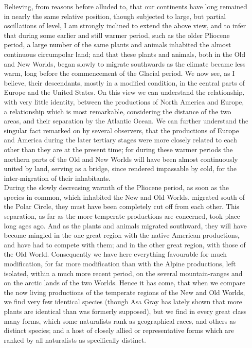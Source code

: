 \indent Believing, from reasons before alluded to, that our continents have long remained in nearly the same relative position, though subjected to large, but partial oscillations of level, I am strongly inclined to extend the above view, and to infer that during some earlier and still warmer period, such as the older Pliocene period, a large number of the same plants and animals inhabited the almost continuous circumpolar land; and that these plants and animals, both in the Old and New Worlds, began slowly to migrate southwards as the climate became less warm, long before the commencement of the Glacial period. We now see, as I believe, their descendants, mostly in a modified condition, in the central parts of Europe and the United States. On this view we can understand the relationship, with very little identity, between the productions of North America and Europe, a relationship which is most remarkable, considering the distance of the two areas, and their separation by the Atlantic Ocean.  We can further understand the singular fact remarked on by several observers, that the productions of Europe and America during the later tertiary stages were more closely related to each other than they are at the present time; for during these warmer periods the northern parts of the Old and New Worlds will have been almost continuously united by land, serving as a bridge, since rendered impassable by cold, for the inter-migration of their inhabitants.~\\
\indent During the slowly decreasing warmth of the Pliocene period, as soon as the species in common, which inhabited the New and Old Worlds, migrated south of the Polar Circle, they must have been completely cut off from each other. This separation, as far as the more temperate productions are concerned, took place long ages ago. And as the plants and animals migrated southward, they will have become mingled in the one great region with the native American productions, and have had to compete with them; and in the other great region, with those of the Old World. Consequently we have here everything favourable for much modification, for far more modification than with the Alpine productions, left isolated, within a much more recent period, on the several mountain-ranges and on the arctic lands of the two Worlds. Hence it has come, that when we compare the now living productions of the temperate regions of the New and Old Worlds, we find very few identical species (though Asa Gray has lately shown that more plants are identical than was formerly supposed), but we find in every great class many forms, which some naturalists rank as geographical races, and others as distinct species; and a host of closely allied or representative forms which are ranked by all naturalists as specifically distinct.~\\
